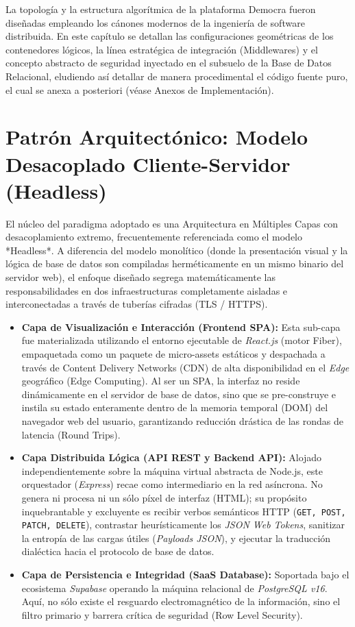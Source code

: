 \documentclass[11pt,a4paper,oneside]{report}
\begin{document}
La topolog\'ia y la estructura algor\'itmica de la plataforma Democra fueron dise\~nadas empleando los c\'anones modernos de la ingenier\'ia de software distribuida. En este cap\'itulo se detallan las configuraciones geom\'etricas de los contenedores l\'ogicos, la l\'inea estrat\'egica de integraci\'on (Middlewares) y el concepto abstracto de seguridad inyectado en el subsuelo de la Base de Datos Relacional, eludiendo as\'i detallar de manera procedimental el c\'odigo fuente puro, el cual se anexa a posteriori (v\'ease Anexos de Implementaci\'on).

\section{Patr\'on Arquitect\'onico: Modelo Desacoplado Cliente-Servidor (Headless)}
El n\'ucleo del paradigma adoptado es una Arquitectura en M\'ultiples Capas con desacoplamiento extremo, frecuentemente referenciada como el modelo *Headless*. A diferencia del modelo monol\'itico (donde la presentaci\'on visual y la l\'ogica de base de datos son compiladas herm\'eticamente en un mismo binario del servidor web), el enfoque dise\~nado segrega matem\'aticamente las responsabilidades en dos infraestructuras completamente aisladas e interconectadas a trav\'es de tuber\'ias cifradas (TLS / HTTPS).

\begin{itemize}
    \item \textbf{Capa de Visualizaci\'on e Interacci\'on (Frontend SPA):} Esta sub-capa fue materializada utilizando el entorno ejecutable de \textit{React.js} (motor Fiber), empaquetada como un paquete de micro-assets est\'aticos y despachada a trav\'es de Content Delivery Networks (CDN) de alta disponibilidad en el \textit{Edge} geogr\'afico (Edge Computing). Al ser un SPA, la interfaz no reside din\'amicamente en el servidor de base de datos, sino que se pre-construye e instila su estado enteramente dentro de la memoria temporal (DOM) del navegador web del usuario, garantizando reducci\'on dr\'astica de las rondas de latencia (Round Trips).
    \item \textbf{Capa Distribuida L\'ogica (API REST y Backend API):} Alojado independientemente sobre la m\'aquina virtual abstracta de Node.js, este orquestador (\textit{Express}) recae como intermediario en la red as\'incrona. No genera ni procesa ni un s\'olo p\'ixel de interfaz (HTML); su prop\'osito inquebrantable y excluyente es recibir verbos sem\'anticos HTTP (\texttt{GET, POST, PATCH, DELETE}), contrastar heur\'isticamente los \textit{JSON Web Tokens}, sanitizar la entrop\'ia de las cargas \'utiles (\textit{Payloads JSON}), y ejecutar la traducci\'on dial\'ectica hacia el protocolo de base de datos.
    \item \textbf{Capa de Persistencia e Integridad (SaaS Database):} Soportada bajo el ecosistema \textit{Supabase} operando la m\'aquina relacional de \textit{PostgreSQL v16}. Aqu\'i, no s\'olo existe el resguardo electromagn\'etico de la informaci\'on, sino el filtro primario y barrera cr\'itica de seguridad (Row Level Security).
\end{itemize}
\end{document}
